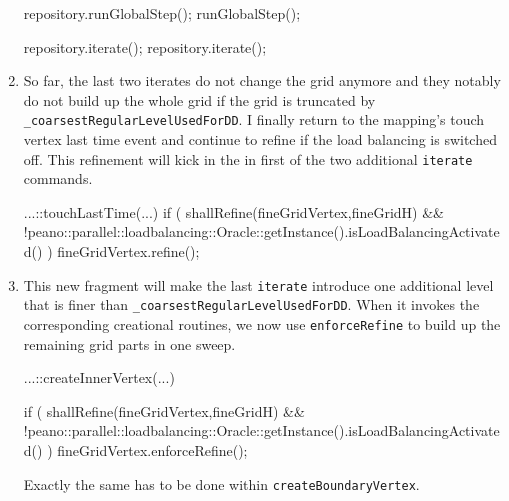 \begin{enumerate}
\begin{code}
repository.runGlobalStep();
runGlobalStep();

repository.iterate();
repository.iterate();
  \end{code}
  \item So far, the last two iterates do not change the grid anymore and they
  notably do not build up the whole grid if the grid is truncated by
  \texttt{\_coarsestRegularLevelUsedForDD}. I finally return to the mapping's
  touch vertex last time event and continue to refine if the load balancing is
  switched off. This refinement will kick in the in first of the two additional
  \texttt{iterate} commands.
  \begin{code}
...::touchLastTime(...) {
  if (
    shallRefine(fineGridVertex,fineGridH)
    &&
    !peano::parallel::loadbalancing::Oracle::getInstance().isLoadBalancingActivated()
  ) {
    fineGridVertex.refine();
  }
}
  \end{code}
  \item This new fragment will make the last \texttt{iterate} introduce one
  additional level that is finer than \texttt{\_coarsestRegularLevelUsedForDD}. 
  When it invokes the corresponding creational routines, we now use
  \texttt{enforceRefine} to build up the remaining grid parts in one sweep. 
  \begin{code}
...::createInnerVertex(...) {
  if ( 
    shallRefine(fineGridVertex,fineGridH) 
    &&
    !peano::parallel::loadbalancing::Oracle::getInstance().isLoadBalancingActivated()
  ) {
    fineGridVertex.enforceRefine();
  }

}
\end{code}
  Exactly the same has to be done within \texttt{createBoundaryVertex}.
\end{enumerate}



